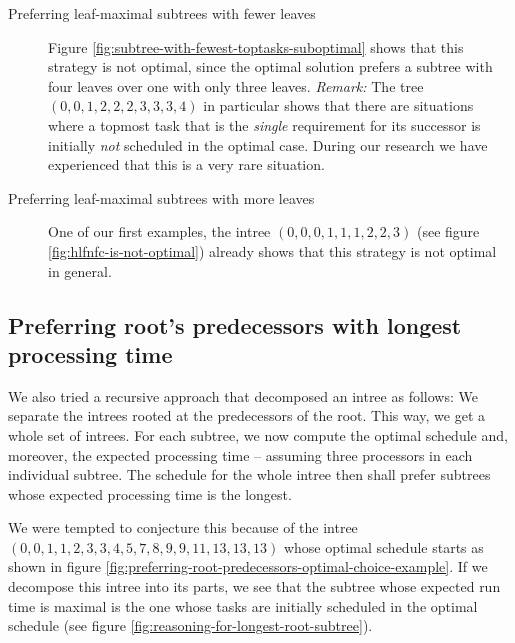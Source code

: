 \begin{description}
\item [Preferring leaf-maximal subtrees with fewer leaves] Figure \ref{fig:subtree-with-fewest-toptasks-suboptimal} shows that this strategy is not optimal, since the optimal solution prefers a subtree with four leaves over one with only three leaves.
  \emph{Remark:} The tree $(0,0,1,2,2,2,3,3,3,4)$ in particular shows that there are situations where a topmost task that is the \emph{single} requirement for its successor is initially \emph{not} scheduled in the optimal case. During our research we have experienced that this is a very rare situation.
\item [Preferring leaf-maximal subtrees with more leaves] One of our first examples, the intree $(0,0,0,1,1,1,2,2,3)$ (see figure \ref{fig:hlfnfc-is-not-optimal}) already shows that this strategy is not optimal in general.
\end{description}

\subsection{Preferring root's predecessors with longest processing time}
\label{sec:suboptimal-hlf-can-roots-longest-predecessors}

We also tried a recursive approach that decomposed an intree as follows: We separate the intrees rooted at the predecessors of the root. This way, we get a whole set of intrees. For each subtree, we now compute the optimal schedule and, moreover, the expected processing time -- assuming three processors in each individual subtree. The schedule for the whole intree then shall prefer subtrees whose expected processing time is the longest.

We were tempted to conjecture this because of the intree $(0,0,1,1,2,3,3,4,5,7,8,9,9,11,13,13,13)$ whose optimal schedule starts as shown in figure \ref{fig:preferring-root-predecessors-optimal-choice-example}. If we decompose this intree into its parts, we see that the subtree whose expected run time is maximal is the one whose tasks are initially scheduled in the optimal schedule (see figure \ref{fig:reasoning-for-longest-root-subtree}).

